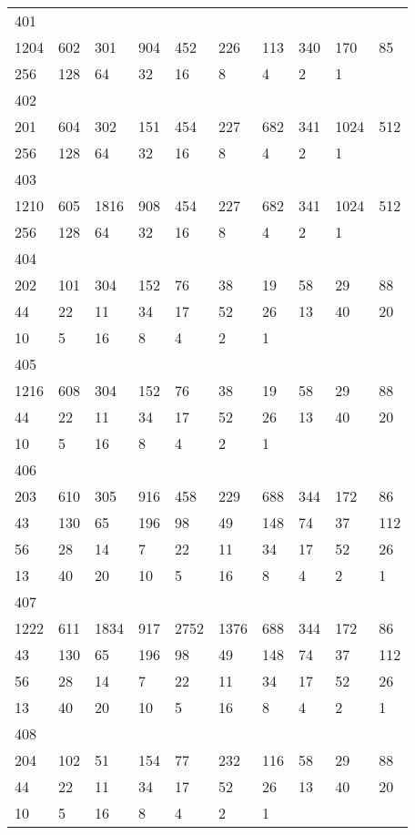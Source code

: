 \begin{longtable}{*{10}{l}}
401&&&&&&&&&\\
1204& 602& 301& 904& 452& 226& 113& 340& 170& 85\\
256& 128& 64& 32& 16& 8& 4& 2& 1& \\

402&&&&&&&&&\\
201& 604& 302& 151& 454& 227& 682& 341& 1024& 512\\
256& 128& 64& 32& 16& 8& 4& 2& 1& \\

403&&&&&&&&&\\
1210& 605& 1816& 908& 454& 227& 682& 341& 1024& 512\\
256& 128& 64& 32& 16& 8& 4& 2& 1& \\

404&&&&&&&&&\\
202& 101& 304& 152& 76& 38& 19& 58& 29& 88\\
44& 22& 11& 34& 17& 52& 26& 13& 40& 20\\
10& 5& 16& 8& 4& 2& 1& \\

405&&&&&&&&&\\
1216& 608& 304& 152& 76& 38& 19& 58& 29& 88\\
44& 22& 11& 34& 17& 52& 26& 13& 40& 20\\
10& 5& 16& 8& 4& 2& 1& \\

406&&&&&&&&&\\
203& 610& 305& 916& 458& 229& 688& 344& 172& 86\\
43& 130& 65& 196& 98& 49& 148& 74& 37& 112\\
56& 28& 14& 7& 22& 11& 34& 17& 52& 26\\
13& 40& 20& 10& 5& 16& 8& 4& 2& 1\\

407&&&&&&&&&\\
1222& 611& 1834& 917& 2752& 1376& 688& 344& 172& 86\\
43& 130& 65& 196& 98& 49& 148& 74& 37& 112\\
56& 28& 14& 7& 22& 11& 34& 17& 52& 26\\
13& 40& 20& 10& 5& 16& 8& 4& 2& 1\\

408&&&&&&&&&\\
204& 102& 51& 154& 77& 232& 116& 58& 29& 88\\
44& 22& 11& 34& 17& 52& 26& 13& 40& 20\\
10& 5& 16& 8& 4& 2& 1& \\


\end{longtable}
